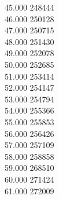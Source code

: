 { 45.000	248444 \\
 46.000	250128 \\
 47.000	250715 \\
 48.000	251430 \\
 49.000	252078 \\
 50.000	252685 \\
 51.000	253414 \\
 52.000	254147 \\
 53.000	254794 \\
 54.000	255366 \\
 55.000	255853 \\
 56.000	256426 \\
 57.000	257109 \\
 58.000	258858 \\
 59.000	268510 \\
 60.000	271424 \\
 61.000	272009 \\
}
